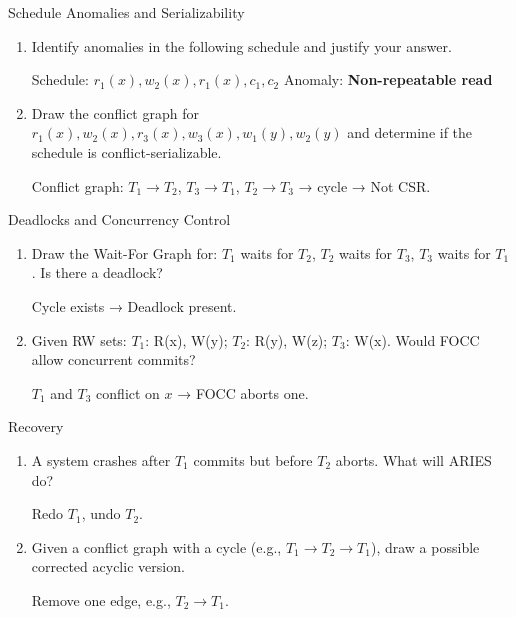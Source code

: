 \documentclass{article}
\author{Leopold Lemmermann}
\begin{document}
\createtitle


\begin{exercise}{Schedule Anomalies and Serializability}
  \begin{enumerate}
    \item Identify anomalies in the following schedule and justify your answer. \begin{solution}
      Schedule: $r_1(x), w_2(x), r_1(x), c_1, c_2$  
      Anomaly: \textbf{Non-repeatable read}
    \end{solution}
    \item Draw the conflict graph for $r_1(x), w_2(x), r_3(x), w_3(x), w_1(y), w_2(y)$ and determine if the schedule is conflict-serializable. \begin{solution}
      Conflict graph: $T_1 \to T_2$, $T_3 \to T_1$, $T_2 \to T_3$ → cycle → Not CSR.
    \end{solution}
  \end{enumerate}
\end{exercise}

\begin{exercise}{Deadlocks and Concurrency Control}
  \begin{enumerate}
    \item Draw the Wait-For Graph for: $T_1$ waits for $T_2$, $T_2$ waits for $T_3$, $T_3$ waits for $T_1$. Is there a deadlock? \begin{solution}
      Cycle exists → Deadlock present.
    \end{solution}
    \item Given RW sets: $T_1$: R(x), W(y); $T_2$: R(y), W(z); $T_3$: W(x). Would FOCC allow concurrent commits? \begin{solution}
      $T_1$ and $T_3$ conflict on $x$ → FOCC aborts one.
    \end{solution}
  \end{enumerate}
\end{exercise}

\begin{exercise}{Recovery}
  \begin{enumerate}
    \item A system crashes after $T_1$ commits but before $T_2$ aborts. What will ARIES do? \begin{solution}
      Redo $T_1$, undo $T_2$.
    \end{solution}
    \item Given a conflict graph with a cycle (e.g., $T_1 \to T_2 \to T_1$), draw a possible corrected acyclic version. \begin{solution}
      Remove one edge, e.g., $T_2 \to T_1$.
    \end{solution}
  \end{enumerate}
\end{exercise}
\end{document}
